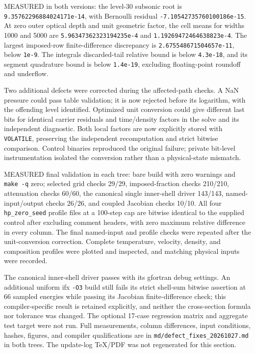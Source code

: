 \documentclass[english,a4paper]{my_memo}
\begin{document}
MEASURED in both versions: the level-30 subsonic root is \texttt{9.35762296884024171e-14}, with Bernoulli residual \texttt{-7.10542735760100186e-15}. At zero outer optical depth and unit geometric factor, the cell means for widths 1000 and 5000 are \texttt{5.96347362323194235e-4} and \texttt{1.19269472464638823e-4}. The largest imposed-row finite-difference discrepancy is \texttt{2.675548671504657e-11}, below \texttt{1e-9}. The integral\textquotesingle s discarded-tail relative bound is below \texttt{4.3e-18}, and its segment quadrature bound is below \texttt{1.4e-19}, excluding floating-point roundoff and underflow.

Two additional defects were corrected during the affected-path checks. A NaN pressure could pass table validation; it is now rejected before its logarithm, with the offending level identified. Optimized unit conversion could give different last bits for identical carrier residuals and time/density factors in the solve and its independent diagnostic. Both local factors are now explicitly stored with \texttt{VOLATILE}, preserving the independent recomputation and strict bitwise comparison. Control binaries reproduced the original failure; private bit-level instrumentation isolated the conversion rather than a physical-state mismatch.

MEASURED final validation in each tree: bare build with zero warnings and \texttt{make\ -q} zero; selected grid checks 29/29, imposed-fraction checks 210/210, attenuation checks 60/60, the canonical single inner-shell driver 143/143, named-input/output checks 26/26, and coupled Jacobian checks 10/10. All four \texttt{hp\_zero\_seed} profile files at a 100-step cap are bitwise identical to the supplied control after excluding comment headers, with zero maximum relative difference in every column. The final named-input and profile checks were repeated after the unit-conversion correction. Complete temperature, velocity, density, and composition profiles were plotted and inspected, and matching physical inputs were recorded.

The canonical inner-shell driver passes with its gfortran debug settings. An additional uniform ifx \texttt{-O3} build still fails its strict shell-sum bitwise assertion at 66 sampled energies while passing its Jacobian finite-difference check; this compiler-specific result is retained explicitly, and neither the cross-section formula nor tolerance was changed. The optional 17-case regression matrix and aggregate test target were not run. Full measurements, column differences, input conditions, hashes, figures, and compiler qualifications are in \texttt{md/defect\_fixes\_20261027.md} in both trees. The update-log TeX/PDF was not regenerated for this section.
\end{document}
